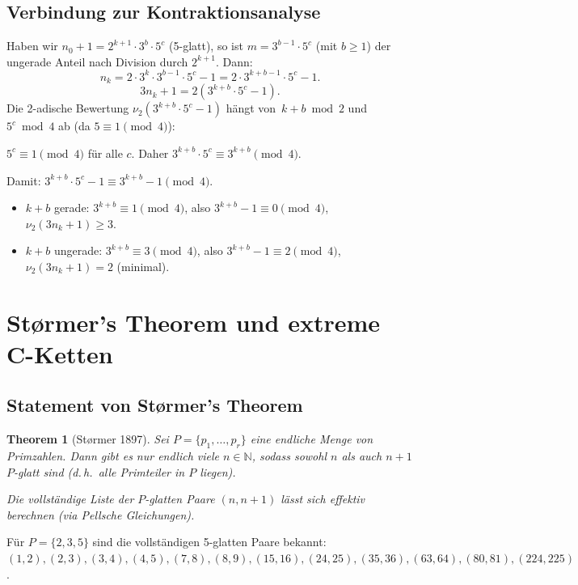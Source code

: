 \documentclass[12pt,a4paper]{article}
\newtheorem{theorem}[definition]{Theorem}
\newcommand{\vii}{\nu_2}
\newcommand{\N}{\mathbb{N}}
\begin{document}
\subsection{Verbindung zur Kontraktionsanalyse}

Haben wir $n_0+1 = 2^{k+1} \cdot 3^b \cdot 5^c$ (5-glatt), so ist
$m = 3^{b-1} \cdot 5^c$ (mit $b \geq 1$) der ungerade Anteil nach Division
durch $2^{k+1}$. Dann:
\[
  n_k = 2 \cdot 3^k \cdot 3^{b-1} \cdot 5^c - 1 = 2 \cdot 3^{k+b-1} \cdot 5^c - 1.
\]
\[
  3n_k + 1 = 2(3^{k+b} \cdot 5^c - 1).
\]
Die 2-adische Bewertung $\vii(3^{k+b} \cdot 5^c - 1)$ hängt von~$k+b \bmod 2$
und $5^c \bmod 4$ ab (da $5 \equiv 1 \pmod 4$):

$5^c \equiv 1 \pmod 4$ für alle $c$. Daher $3^{k+b} \cdot 5^c \equiv 3^{k+b} \pmod 4$.

Damit: $3^{k+b} \cdot 5^c - 1 \equiv 3^{k+b} - 1 \pmod 4$.
\begin{itemize}
  \item $k+b$ gerade: $3^{k+b} \equiv 1 \pmod 4$, also $3^{k+b}-1 \equiv 0 \pmod 4$,
    $\vii(3n_k+1) \geq 3$.
  \item $k+b$ ungerade: $3^{k+b} \equiv 3 \pmod 4$, also $3^{k+b}-1 \equiv 2 \pmod 4$,
    $\vii(3n_k+1) = 2$ (minimal).
\end{itemize}

\section{Størmer's Theorem und extreme C-Ketten}
\label{sec:stoermer}

\subsection{Statement von Størmer's Theorem}

\begin{theorem}[Størmer 1897]
\label{thm:stoermer}
Sei $P = \{p_1, \ldots, p_r\}$ eine endliche Menge von Primzahlen.
Dann gibt es nur endlich viele $n \in \N$, sodass sowohl $n$ als auch $n+1$
$P$-glatt sind (d.\,h.\ alle Primteiler in $P$ liegen).

Die vollständige Liste der $P$-glatten Paare $(n, n+1)$ lässt sich effektiv
berechnen (via Pellsche Gleichungen).
\end{theorem}

Für $P = \{2, 3, 5\}$ sind die vollständigen 5-glatten Paare bekannt:
$(1,2), (2,3), (3,4), (4,5), (7,8), (8,9), (15,16), (24,25), (35,36), (63,64), (80,81), (224,225)$.
\end{document}
